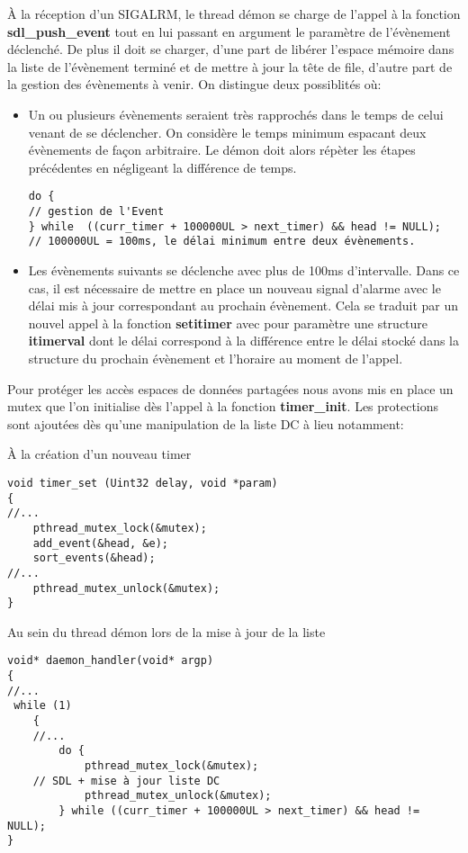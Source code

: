 \documentclass[a4paper]{article}
\begin{document}
À la réception d'un SIGALRM, le thread démon se charge de l'appel à la fonction \textbf{sdl\_push\_event} tout en lui passant en argument le paramètre de l'évènement déclenché. De plus il doit se charger, d'une part de libérer l'espace mémoire dans la liste de l'évènement terminé et de mettre à jour la tête de file, d'autre part de la gestion des évènements à venir. On distingue deux possiblités où: 

\begin{itemize}
\item Un ou plusieurs évènements seraient très rapprochés dans le temps de celui venant de se déclencher. On considère le temps minimum espacant deux évènements de façon arbitraire. Le démon doit alors répèter les étapes précédentes en négligeant la différence de temps.
\begin{verbatim}
do { 
// gestion de l'Event
} while  ((curr_timer + 100000UL > next_timer) && head != NULL); 
// 100000UL = 100ms, le délai minimum entre deux évènements.
\end{verbatim}

\item Les évènements suivants se déclenche avec plus de 100ms d'intervalle. Dans ce cas, il est nécessaire de mettre en place un nouveau signal d'alarme avec le délai mis à jour correspondant au prochain évènement. Cela se traduit par un nouvel appel à la fonction \textbf{setitimer} avec pour paramètre une structure \textbf{itimerval} dont le délai correspond à la différence entre le délai stocké dans la structure du prochain évènement et l'horaire au moment de l'appel.
\end{itemize}

Pour protéger les accès espaces de données partagées nous avons mis en place un mutex que l'on initialise dès l'appel à la fonction \textbf{timer\_init}. Les protections sont ajoutées dès qu'une manipulation de la liste DC à lieu notamment:

À la création d'un nouveau timer
\begin{verbatim}
void timer_set (Uint32 delay, void *param)
{
//...
    pthread_mutex_lock(&mutex);
    add_event(&head, &e);
    sort_events(&head);
//...
    pthread_mutex_unlock(&mutex);
}
\end{verbatim}

Au sein du thread démon lors de la mise à jour de la liste
\begin{verbatim}
void* daemon_handler(void* argp)
{
//...
 while (1)
    {
	//...
        do {
            pthread_mutex_lock(&mutex);
	// SDL + mise à jour liste DC
            pthread_mutex_unlock(&mutex);
        } while ((curr_timer + 100000UL > next_timer) && head != NULL);
}
\end{verbatim}
\end{document}
